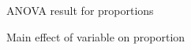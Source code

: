 \documentclass{article}
\begin{document}
\begin{figure}[H]
  \caption{ANOVA result for proportions}
  \noindent{}
  \centering
\end{figure}

\begin{figure}[H]
  \caption{Main effect of variable on proportion}
  \noindent{}
  \centering
\end{figure}
\end{document}
